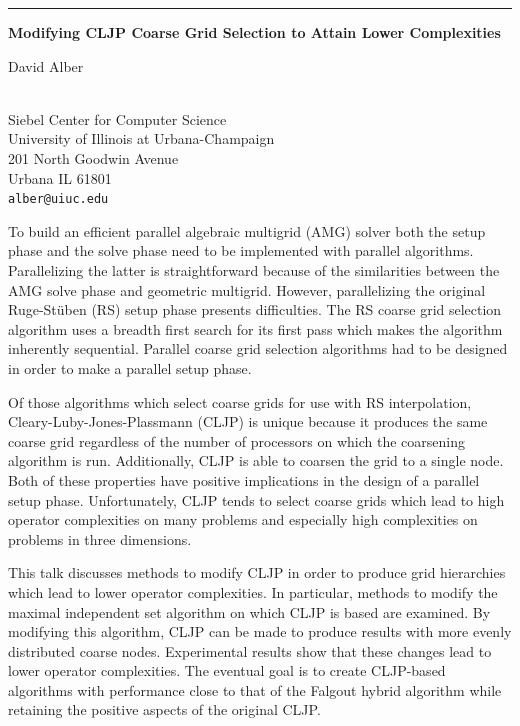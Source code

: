 \documentclass[twosided]{report}
\begin{document}

\begin{center}
\rule{6in}{1pt}
\end{center}

\begin{center}
{\large			\label{alber}
{\bf Modifying CLJP Coarse Grid Selection to Attain Lower
Complexities}

David Alber} \\
Siebel Center for Computer Science \\ University of Illinois at
Urbana-Champaign \\ 201 North Goodwin Avenue \\ Urbana IL 61801
\\
{\tt alber@uiuc.edu}
\end{center}

To build an efficient parallel algebraic multigrid (AMG) solver both
the setup phase and the solve phase need to be implemented with
parallel algorithms.  Parallelizing the latter is straightforward
because of the similarities between the AMG solve phase and geometric
multigrid.  However, parallelizing the original Ruge-St\"{u}ben (RS) setup
phase presents difficulties.  The RS coarse grid selection algorithm
uses a breadth first search for its first pass which makes the
algorithm inherently sequential.  Parallel coarse grid selection
algorithms had to be designed in order to make a parallel setup phase.

Of those algorithms which select coarse grids for use with RS
interpolation, Cleary-Luby-Jones-Plassmann (CLJP) is unique because it
produces the same coarse grid regardless of the number of processors on
which the coarsening algorithm is run.  Additionally, CLJP is able to
coarsen the grid to a single node.  Both of these properties have
positive implications in the design of a parallel setup phase.
Unfortunately, CLJP tends to select coarse grids which lead to high
operator complexities on many problems and especially high complexities
on problems in three dimensions.

This talk discusses methods to modify CLJP in order to produce grid
hierarchies which lead to lower operator complexities.  In particular,
methods to modify the maximal independent set algorithm on which CLJP
is based are examined.  By modifying this algorithm, CLJP can be made
to produce results with more evenly distributed coarse nodes.
Experimental results show that these changes lead to lower operator
complexities.  The eventual goal is to create CLJP-based algorithms
with performance close to that of the Falgout hybrid algorithm while
retaining the positive aspects of the original CLJP.
\end{document}
